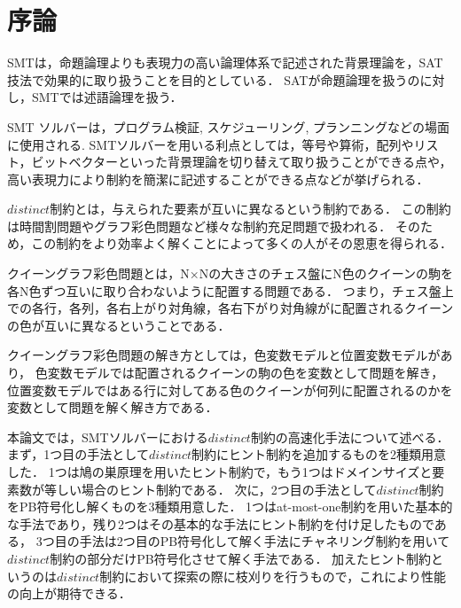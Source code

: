 \chapter{序論}


SMTは，命題論理よりも表現力の高い論理体系で記述された背景理論を，SAT技法で効果的に取り扱うことを目的としている．
SATが命題論理を扱うのに対し，SMTでは述語論理を扱う．

SMT ソルバーは，プログラム検証, スケジューリング, プランニングなどの場面に使用される.
SMTソルバーを用いる利点としては，等号や算術，配列やリスト，ビットベクターといった背景理論を切り替えて取り扱うことができる点や，
高い表現力により制約を簡潔に記述することができる点などが挙げられる．


$distinct$制約とは，与えられた要素が互いに異なるという制約である．
この制約は時間割問題やグラフ彩色問題など様々な制約充足問題で扱われる．
そのため，この制約をより効率よく解くことによって多くの人がその恩恵を得られる．


クイーングラフ彩色問題とは，N×Nの大きさのチェス盤にN色のクイーンの駒を各N色ずつ互いに取り合わないように配置する問題である．
つまり，チェス盤上での各行，各列，各右上がり対角線，各右下がり対角線がに配置されるクイーンの色が互いに異なるということである．

クイーングラフ彩色問題の解き方としては，色変数モデルと位置変数モデルがあり，
色変数モデルでは配置されるクイーンの駒の色を変数として問題を解き，
位置変数モデルではある行に対してある色のクイーンが何列に配置されるのかを変数として問題を解く解き方である．




本論文では，SMTソルバーにおける$distinct$制約の高速化手法について述べる．
まず，1つ目の手法として$distinct$制約にヒント制約を追加するものを2種類用意した．
1つは鳩の巣原理を用いたヒント制約で，もう1つはドメインサイズと要素数が等しい場合のヒント制約である．
次に，2つ目の手法として$distinct$制約をPB符号化し解くものを3種類用意した．
1つはat-most-one制約を用いた基本的な手法であり，残り2つはその基本的な手法にヒント制約を付け足したものである，
3つ目の手法は2つ目のPB符号化して解く手法にチャネリング制約を用いて$distinct$制約の部分だけPB符号化させて解く手法である．
加えたヒント制約というのは$distinct$制約において探索の際に枝刈りを行うもので，これにより性能の向上が期待できる．

